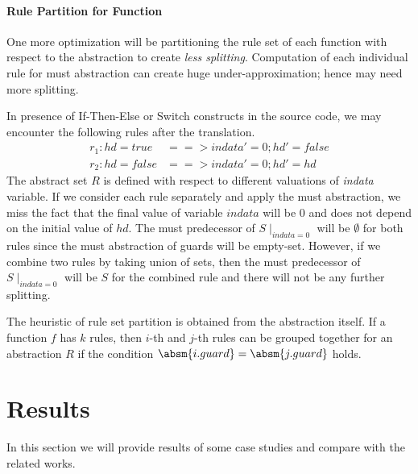 \documentclass{llncs}
\begin{document}
\paragraph{Rule Partition for Function}
One more optimization will be partitioning the rule set of each function with respect to the abstraction
to create {\em less splitting}. 
Computation of each individual rule for must abstraction can create huge under-approximation; hence may need more splitting.
\begin{example}
In presence of If-Then-Else or Switch constructs in the source code, we may encounter the following rules after the translation. 
\begin{align*}
 r_1 : hd = true & ==> indata' =0 ; hd' = false\\
 r_2 : hd = false & ==> indata'=0 ; hd'= hd
\end{align*}
The abstract set $R$ is defined with respect to different valuations of {\em indata} variable.
If we consider each rule separately and apply the must abstraction, we miss the fact that the final value
of  variable $indata$ will be $0$ and does not depend on the initial value of $hd$.
The must predecessor of $S\mid_{indata=0}$ will be $\emptyset$ for both rules since
the must abstraction of guards will be empty-set. 
However, if we combine two rules by taking union of sets, then the must predecessor of $S\mid_{indata=0}$ will be $S$ for the combined rule and there will not be any further splitting.
\end{example}
The heuristic of rule set partition is obtained from the abstraction itself. 
If a function $f$ has $k$ rules, then $i$-th and $j$-th rules can be grouped together for an abstraction 
$R$ if  the condition  $\absm{i.guard} = \absm{j.guard}$ holds. 























\section{Results}
In this section we will provide results of some case studies and  compare with the related works.
\end{document}
